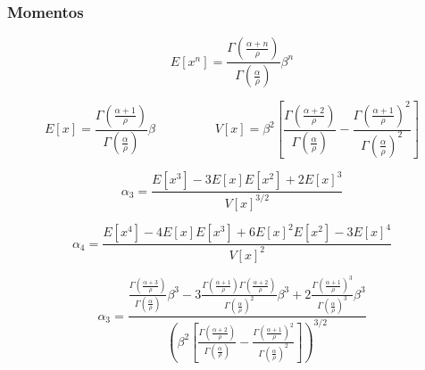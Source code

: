 \begin{frame}
    \frametitle{Momentos}
    \begin{equation*}
        E[x^n] = \frac{\Gamma \left (\frac{\alpha+n}{\rho} \right)}{{\Gamma \left ( \frac{\alpha}{\rho} \right)}} \beta^n
    \end{equation*}

    \begin{equation*}
        E[x] = \frac{\Gamma \left (\frac{\alpha+1}{\rho} \right)}{{\Gamma \left ( \frac{\alpha}{\rho} \right)}} \beta
        \hspace{2cm}
        V[x] = \beta^2 \left[ \frac{\Gamma \left (\frac{\alpha+2}{\rho} \right)}{{\Gamma \left ( \frac{\alpha}{\rho} \right)}} -
                               \frac{\Gamma \left (\frac{\alpha+1}{\rho} \right)^2}{{\Gamma \left ( \frac{\alpha}{\rho} \right)}^2} \right]
    \end{equation*}

    \vspace{0.5cm}

    \begin{equation*}
        \alpha_3 = \frac{E[x^3] - 3 E[x] E[x^2] + 2 E[x]^3}{V[x]^{3/2}}
    \end{equation*}

    \vspace{0.5cm}

    \begin{equation*}
        \alpha_4 = \frac{E[x^4] - 4 E[x] E[x^3] + 6 E[x]^2 E[x^2] - 3 E[x]^4}{V[x]^2}
    \end{equation*}
\end{frame}

\begin{frame}
    \begin{equation*}
        \alpha_3 = \frac{
                        \frac{ \Gamma \left (\frac{\alpha+3}{\rho}\right) }{ \Gamma \left (\frac{\alpha}{\rho} \right) } \beta^3
                        - 3 \frac{ \Gamma \left (\frac{\alpha+1}{\rho} \right) \Gamma \left (\frac{\alpha+2}{\rho} \right) }{ \Gamma \left ( \frac{\alpha}{\rho} \right)^2 } \beta^3
                        + 2 \frac{\Gamma \left (\frac{\alpha+1}{\rho} \right)^3}{\Gamma \left ( \frac{\alpha}{\rho} \right)^3} \beta^3
                    }{
                        \left( \beta^2 \left[ \frac{\Gamma \left (\frac{\alpha+2}{\rho} \right)}{{\Gamma \left ( \frac{\alpha}{\rho} \right)}} -
                        \frac{\Gamma \left (\frac{\alpha+1}{\rho} \right)^2}{{\Gamma \left ( \frac{\alpha}{\rho} \right)}^2} \right] \right)^{3/2}
                    }
    \end{equation*}
\end{frame}

